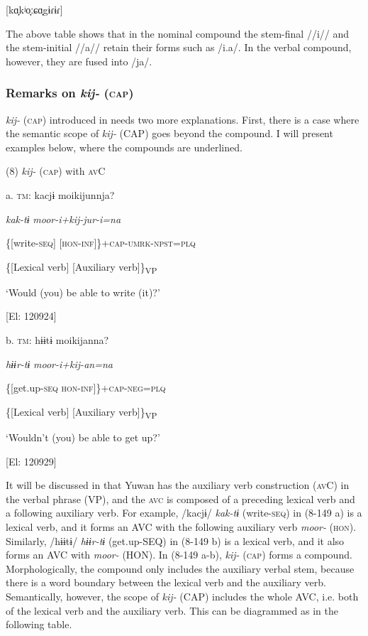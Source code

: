 [kɑ̞kʲo̞ːɕɑ̞gɨɾɨɾ]

The above table shows that in the nominal compound the stem-final //i// and the stem-initial //a// retain their forms such as /i.a/. In the verbal compound, however, they are fused into /ja/.

\subsubsection{Remarks on \textit{kij-} (\textsc{cap})}

\textit{kij-} (\textsc{cap}) introduced in  needs two more explanations. First, there is a case where the semantic scope of \textit{kij-} (CAP) goes beyond the compound. I will present examples below, where the compounds are underlined.

(8)  \textit{kij-} (\textsc{cap}) with \textsc{av}C

  a.  \textsc{tm}:  kacjɨ  moikijunnja?

      \textit{kak-tɨ}  \textit{moor-i+kij{}-jur-i=na}

      \{[write-\textsc{seq}]  [\textsc{hon}-\textsc{inf}]\}+\textsc{cap}-\textsc{umrk}-\textsc{npst}=\textsc{plq}

      \{[Lexical verb]  [Auxiliary verb]\}\textsubscript{VP}

      ‘Would (you) be able to write (it)?’

      [El: 120924]

  b.  \textsc{tm}:  hɨɨtɨ  moikijanna?

      \textit{hɨɨr-tɨ}  \textit{moor-i+kij{}-an=na}

      \{[get.up-\textsc{seq}  \textsc{hon}-\textsc{inf}]\}+\textsc{cap}-\textsc{neg}=\textsc{plq}

      \{[Lexical verb]  [Auxiliary verb]\}\textsubscript{VP}

      ‘Wouldn’t (you) be able to get up?’

      [El: 120929]

It will be discussed in  that Yuwan has the auxiliary verb construction (\textsc{av}C) in the verbal phrase (VP), and the \textsc{avc} is composed of a preceding lexical verb and a following auxiliary verb. For example, /kacjɨ/ \textit{kak-tɨ} (write-\textsc{seq}) in (8-149 a) is a lexical verb, and it forms an AVC with the following auxiliary verb \textit{moor-} (\textsc{hon}). Similarly, /hɨɨtɨ/ \textit{hɨɨr-tɨ} (get.up-SEQ) in (8-149 b) is a lexical verb, and it also forms an AVC with \textit{moor-} (HON). In (8-149 a-b), \textit{kij-} (\textsc{cap}) forms a compound. Morphologically, the compound only includes the auxiliary verbal stem, because there is a word boundary between the lexical verb and the auxiliary verb. Semantically, however, the scope of \textit{kij-} (CAP) includes the whole AVC, i.e. both of the lexical verb and the auxiliary verb. This can be diagrammed as in the following table.

